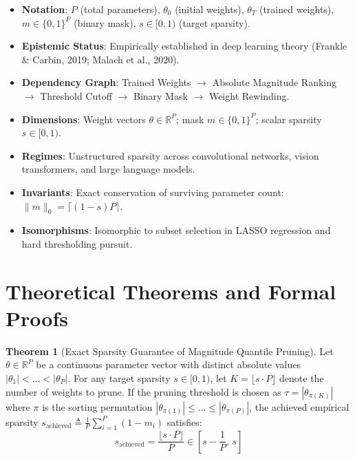 \documentclass[11pt,a4paper]{article}
\theoremstyle{definition}
\newtheorem{theorem}{\textbf{Theorem}}[section]
\begin{document}
\begin{itemize}
    \item \textbf{Notation}: $P$ (total parameters), $\theta_0$ (initial weights), $\theta_T$ (trained weights), $m \in \{0, 1\}^P$ (binary mask), $s \in [0, 1)$ (target sparsity).
    \item \textbf{Epistemic Status}: Empirically established in deep learning theory (Frankle \& Carbin, 2019; Malach et al., 2020).
    \item \textbf{Dependency Graph}: Trained Weights $\to$ Absolute Magnitude Ranking $\to$ Threshold Cutoff $\to$ Binary Mask $\to$ Weight Rewinding.
    \item \textbf{Dimensions}: Weight vectors $\theta \in \mathbb{R}^P$; mask $m \in \{0, 1\}^P$; scalar sparsity $s \in [0, 1)$.
    \item \textbf{Regimes}: Unstructured sparsity across convolutional networks, vision transformers, and large language models.
    \item \textbf{Invariants}: Exact conservation of surviving parameter count: $\|m\|_0 = \lceil (1 - s) P \rceil$.
    \item \textbf{Isomorphisms}: Isomorphic to subset selection in LASSO regression and hard thresholding pursuit.
\end{itemize}

\section{Theoretical Theorems and Formal Proofs}

\begin{theorem}[Exact Sparsity Guarantee of Magnitude Quantile Pruning]
Let $\theta \in \mathbb{R}^P$ be a continuous parameter vector with distinct absolute values $|\theta_1| < \dots < |\theta_P|$. For any target sparsity $s \in [0, 1)$, let $K = \lfloor s \cdot P \rfloor$ denote the number of weights to prune. If the pruning threshold is chosen as $\tau = |\theta_{\pi(K)}|$ where $\pi$ is the sorting permutation $|\theta_{\pi(1)}| \le \dots \le |\theta_{\pi(P)}|$, the achieved empirical sparsity $s_{\text{achieved}} \triangleq \frac{1}{P} \sum_{i=1}^P (1 - m_i)$ satisfies:
{\boldmath
\begin{equation}
s_{\text{achieved}} = \frac{\lfloor s \cdot P \rfloor}{P} \in \left[ s - \frac{1}{P}, \, s \right]
\end{equation}
}
\end{theorem}
\end{document}
